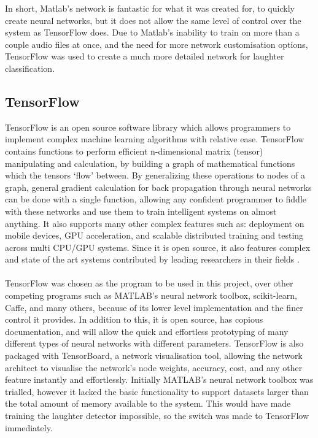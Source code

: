 \documentclass[a4paper,11pt,notitlepage]{article}
\begin{document}
In short, Matlab's network is fantastic for what it was created for, to quickly create neural networks, but it does not allow the same level of control over the system as TensorFlow does. Due to Matlab's inability to train on more than a couple audio files at once, and the need for more network customisation options, TensorFlow was used to create a much more detailed network for laughter classification.

\subsection{TensorFlow}\label{section:Tensorflow}


TensorFlow is an open source software library which allows programmers to implement complex machine learning algorithms with relative ease. TensorFlow contains functions to perform efficient n-dimensional matrix (tensor) manipulating and calculation, by building a graph of mathematical functions which the tensors `flow' between. By generalizing these operations to nodes of a graph, general gradient calculation for back propagation through neural networks can be done with a single function, allowing any confident programmer to fiddle with these networks and use them to train intelligent systems on almost anything. It also supports many other complex features such as: deployment on mobile devices, GPU acceleration, and scalable distributed training and testing across multi CPU/GPU systems. Since it is open source, it also features complex and state of the art systems contributed by leading researchers in their fields \cite{tensorflow2015-whitepaper}.\\
\\
TensorFlow was chosen as the program to be used in this project, over other competing programs such as MATLAB's neural network toolbox, scikit-learn, Caffe, and many others, because of its lower level implementation and the finer control it provides. In addition to this, it is open source, has copious documentation, and will allow the quick and effortless prototyping of many different types of neural networks with different parameters. TensorFlow is also packaged with TensorBoard, a network visualisation tool, allowing the network architect to visualise the network's node weights, accuracy, cost, and any other feature instantly and effortlessly. Initially MATLAB's neural network toolbox was trialled, however it lacked the basic functionality to support datasets larger than the total amount of memory available to the system. This would have made training the laughter detector impossible, so the switch was made to TensorFlow immediately.
\end{document}
